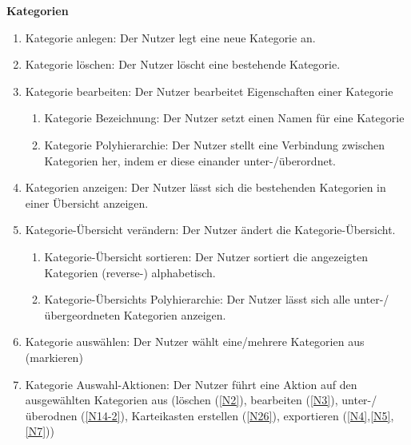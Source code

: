 \documentclass[fontsize=12pt,paper=a4,twoside]{scrartcl}
\begin{document}
\textbf{Kategorien}
\begin{enumerate}[resume, label={N\arabic*}]
	\item Kategorie anlegen: Der Nutzer legt eine neue Kategorie an.
	\item Kategorie löschen: Der Nutzer löscht eine bestehende Kategorie.
	\item Kategorie bearbeiten: Der Nutzer bearbeitet Eigenschaften einer Kategorie
	\begin{enumerate}[label*={-\arabic*}]
		\item Kategorie Bezeichnung: Der Nutzer setzt einen Namen für eine Kategorie
		\item Kategorie Polyhierarchie: Der Nutzer stellt eine Verbindung zwischen Kategorien her, indem er diese einander unter-/überordnet.
		\label{N14-2}
	\end{enumerate}
	\item Kategorien anzeigen: Der Nutzer lässt sich die bestehenden Kategorien in einer Übersicht anzeigen.
	\item Kategorie-Übersicht verändern: Der Nutzer ändert die Kategorie-Übersicht.
	\begin{enumerate}[label*={-\arabic*}]
		\item Kategorie-Übersicht sortieren: Der Nutzer sortiert die angezeigten Kategorien (reverse-) alphabetisch.
		\item Kategorie-Übersichts Polyhierarchie: Der Nutzer lässt sich alle unter-/übergeordneten Kategorien anzeigen.
	\end{enumerate}
	\item Kategorie auswählen: Der Nutzer wählt eine/mehrere Kategorien aus (markieren)
	\item Kategorie Auswahl-Aktionen: Der Nutzer führt eine Aktion auf den ausgewählten Kategorien aus (löschen (\ref{N2}), bearbeiten (\ref{N3}), unter-/überodnen (\ref{N14-2}), Karteikasten erstellen (\ref{N26}), exportieren (\ref{N4},\ref{N5},\ref{N7}))
\end{enumerate}
\end{document}
